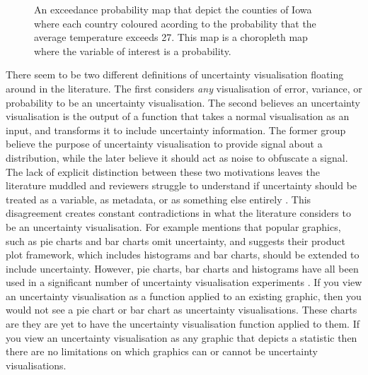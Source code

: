 \documentclass[
  12pt]{article}
\begin{document}
\begin{figure}
\begin{minipage}{0.33\linewidth}
\end{minipage}%
%
\begin{minipage}{0.33\linewidth}



\end{minipage}%

\caption{\label{fig-exceed}An exceedance probability map that depict the
counties of Iowa where each country coloured acording to the probability
that the average temperature exceeds 27. This map is a choropleth map
where the variable of interest is a probability.}

\end{figure}%

There seem to be two different definitions of uncertainty visualisation
floating around in the literature. The first considers \emph{any}
visualisation of error, variance, or probability to be an uncertainty
visualisation. The second believes an uncertainty visualisation is the
output of a function that takes a normal visualisation as an input, and
transforms it to include uncertainty information. The former group
believe the purpose of uncertainty visualisation to provide signal about
a distribution, while the later believe it should act as noise to
obfuscate a signal. The lack of explicit distinction between these two
motivations leaves the literature muddled and reviewers struggle to
understand if uncertainty should be treated as a variable, as metadata,
or as something else entirely \citep{Kinkeldey2014}. This disagreement
creates constant contradictions in what the literature considers to be
an uncertainty visualisation. For example \citet{Leland2005} mentions
that popular graphics, such as pie charts and bar charts omit
uncertainty, and \citet{Wickham2011} suggests their product plot
framework, which includes histograms and bar charts, should be extended
to include uncertainty. However, pie charts, bar charts and histograms
have all been used in a significant number of uncertainty visualisation
experiments \citep{Ibrekk1987, Olston2002, Zhao2023, Hofmann2012}. If
you view an uncertainty visualisation as a function applied to an
existing graphic, then you would not see a pie chart or bar chart as
uncertainty visualisations. These charts are they are yet to have the
uncertainty visualisation function applied to them. If you view an
uncertainty visualisation as any graphic that depicts a statistic then
there are no limitations on which graphics can or cannot be uncertainty
visualisations.
\end{document}
